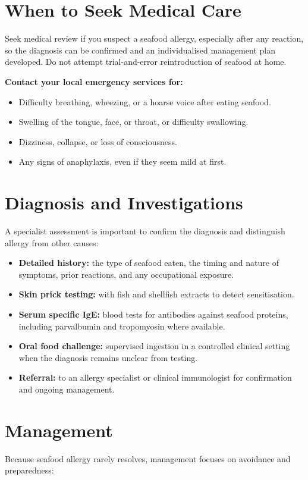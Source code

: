 \section*{When to Seek Medical Care}
Seek medical review if you suspect a seafood allergy, especially after any reaction, so the diagnosis can be confirmed and an individualised management plan developed. Do not attempt trial-and-error reintroduction of seafood at home.

\textbf{Contact your local emergency services for:}
\begin{itemize}
    \item Difficulty breathing, wheezing, or a hoarse voice after eating seafood.
    \item Swelling of the tongue, face, or throat, or difficulty swallowing.
    \item Dizziness, collapse, or loss of consciousness.
    \item Any signs of anaphylaxis, even if they seem mild at first.
\end{itemize}

\section*{Diagnosis and Investigations}
A specialist assessment is important to confirm the diagnosis and distinguish allergy from other causes:

\begin{itemize}
    \item \textbf{Detailed history:} the type of seafood eaten, the timing and nature of symptoms, prior reactions, and any occupational exposure.
    \item \textbf{Skin prick testing:} with fish and shellfish extracts to detect sensitisation.
    \item \textbf{Serum specific IgE:} blood tests for antibodies against seafood proteins, including parvalbumin and tropomyosin where available.
    \item \textbf{Oral food challenge:} supervised ingestion in a controlled clinical setting when the diagnosis remains unclear from testing.
    \item \textbf{Referral:} to an allergy specialist or clinical immunologist for confirmation and ongoing management.
\end{itemize}

\section*{Management}
Because seafood allergy rarely resolves, management focuses on avoidance and preparedness:

